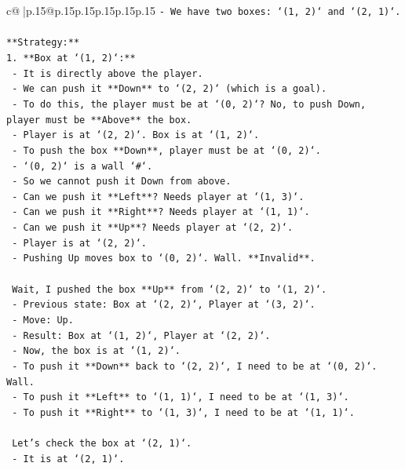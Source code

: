 \documentclass{article}
\begin{document}
{\begin{supertabular}{c@{$\;$}|p{.15\linewidth}@{}p{.15\linewidth}p{.15\linewidth}p{.15\linewidth}p{.15\linewidth}p{.15\linewidth}}
{{{\texttt{{-} We have two boxes: `(1, 2)` and `(2, 1)`.} \\
\\ 
\texttt{**Strategy:**} \\
\texttt{1. **Box at `(1, 2)`:**} \\
\texttt{   {-} It is directly above the player.} \\
\texttt{   {-} We can push it **Down** to `(2, 2)` (which is a goal).} \\
\texttt{   {-} To do this, the player must be at `(0, 2)`? No, to push Down, player must be **Above** the box.} \\
\texttt{   {-} Player is at `(2, 2)`. Box is at `(1, 2)`.} \\
\texttt{   {-} To push the box **Down**, player must be at `(0, 2)`.} \\
\texttt{   {-} `(0, 2)` is a wall `\#`.} \\
\texttt{   {-} So we cannot push it Down from above.} \\
\texttt{   {-} Can we push it **Left**? Needs player at `(1, 3)`.} \\
\texttt{   {-} Can we push it **Right**? Needs player at `(1, 1)`.} \\
\texttt{   {-} Can we push it **Up**? Needs player at `(2, 2)`.} \\
\texttt{     {-} Player is at `(2, 2)`.} \\
\texttt{     {-} Pushing Up moves box to `(0, 2)`. Wall. **Invalid**.} \\
\\ 
\texttt{   Wait, I pushed the box **Up** from `(2, 2)` to `(1, 2)`.} \\
\texttt{   {-} Previous state: Box at `(2, 2)`, Player at `(3, 2)`.} \\
\texttt{   {-} Move: Up.} \\
\texttt{   {-} Result: Box at `(1, 2)`, Player at `(2, 2)`.} \\
\texttt{   {-} Now, the box is at `(1, 2)`.} \\
\texttt{   {-} To push it **Down** back to `(2, 2)`, I need to be at `(0, 2)`. Wall.} \\
\texttt{   {-} To push it **Left** to `(1, 1)`, I need to be at `(1, 3)`.} \\
\texttt{   {-} To push it **Right** to `(1, 3)`, I need to be at `(1, 1)`.} \\
\\ 
\texttt{   Let's check the box at `(2, 1)`.} \\
\texttt{   {-} It is at `(2, 1)`.} \\
}}}
\end{supertabular}}
\end{document}
